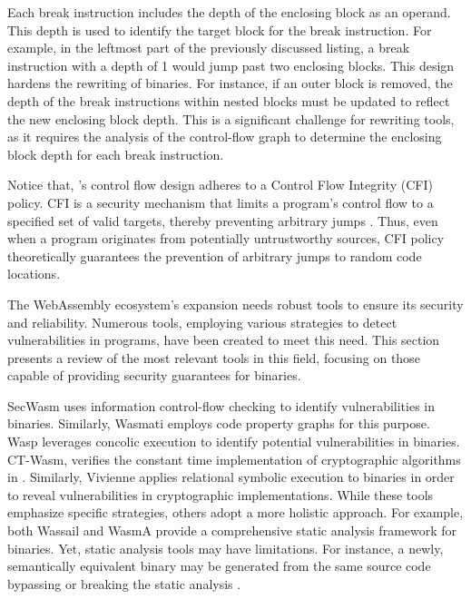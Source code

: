 

Each break instruction includes the depth of the enclosing block as an operand. 
This depth is used to identify the target block for the break instruction. 
For example, in the leftmost part of the previously discussed listing, a break instruction with a depth of 1 would jump past two enclosing blocks.
This design hardens the rewriting of \Wasm binaries.
For instance, if an outer block is removed, the depth of the break instructions within nested blocks must be updated to reflect the new enclosing block depth.
This is a significant challenge for rewriting tools, as it requires the analysis of the control-flow graph to determine the enclosing block depth for each break instruction.

Notice that, \Wasm's control flow design adheres to a Control Flow Integrity (CFI) policy. 
CFI is a security mechanism that limits a program's control flow to a specified set of valid targets, thereby preventing arbitrary jumps \cite{cfi}.
Thus, even when a \Wasm program originates from potentially untrustworthy sources, CFI policy theoretically guarantees the prevention of arbitrary jumps to random code locations.


\label{background:wasm:analysis}

The WebAssembly ecosystem's expansion needs robust tools to ensure its security and reliability. 
Numerous tools, employing various strategies to detect vulnerabilities in \Wasm programs, have been created to meet this need. 
This section presents a review of the most relevant tools in this field, focusing on those capable of providing security guarantees for \Wasm binaries.

 SecWasm\cite{secwasm} uses information control-flow checking to identify vulnerabilities in \Wasm binaries. 
Similarly, Wasmati\cite{wasmati} employs code property graphs for this purpose. 
Wasp\cite{Wasp} leverages concolic execution to identify potential vulnerabilities in \Wasm binaries. 
CT-Wasm\cite{ctwasm}, verifies the constant time implementation of cryptographic algorithms in \Wasm. 
Similarly, Vivienne applies relational symbolic execution to \Wasm binaries in order to reveal vulnerabilities in cryptographic implementations\cite{Vivienne}. 
While these tools emphasize specific strategies, others adopt a more holistic approach. 
For example, both Wassail\cite{wassail} and WasmA\cite{WasmA} provide a comprehensive static analysis framework for \Wasm binaries. 
Yet, static analysis tools may have limitations. 
For instance, a newly, semantically equivalent \Wasm binary may be generated from the same source code bypassing or breaking the static analysis \cite{wasmixer}.

